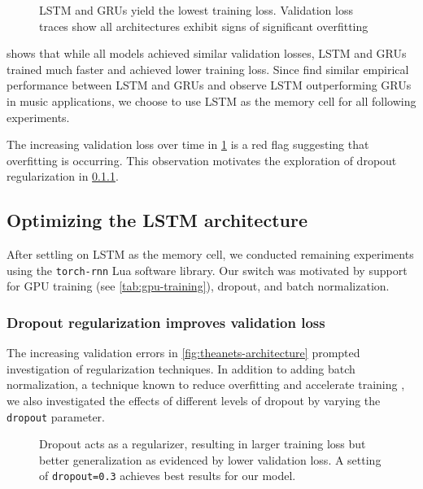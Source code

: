 \begin{figure}[tb]
    \centering
    
    \caption{LSTM and GRUs yield the lowest training loss. Validation loss
      traces show all architectures exhibit signs of significant overfitting}
    \label{fig:theanets-architecture}
\end{figure}

 shows that while all models achieved similar
validation losses, LSTM and GRUs trained much faster and achieved lower
training loss. Since \citet{zaremba2015empirical} find similar empirical
performance between LSTM and GRUs and \citet{Nayebi2015} observe LSTM
outperforming GRUs in music applications, we choose to use LSTM as the memory
cell for all following experiments.

The increasing validation loss over time in \cref{fig:theanets-architecture}
is a red flag suggesting that overfitting is occurring. This observation motivates
the exploration of dropout regularization in \cref{sec:lstm-dropout}.

\subsection{Optimizing the LSTM architecture}\label{sec:lstm-grid-search}

After settling on LSTM as the memory cell, we conducted remaining experiments
using the \texttt{torch-rnn} Lua software library. Our switch was motivated by
support for GPU training (see \vref{tab:gpu-training}), dropout, and batch normalization.

\subsubsection{Dropout regularization improves validation loss}\label{sec:lstm-dropout}

The increasing validation errors in \vref{fig:theanets-architecture} prompted
investigation of regularization techniques. In addition to adding batch
normalization, a technique known to reduce overfitting and accelerate training
\cite{ioffe2015batch}, we also investigated the effects of different levels
of dropout by varying the \texttt{dropout} parameter.

\begin{figure}[tb]
  \centering
  
  \caption{Dropout acts as a regularizer, resulting in larger training loss
  but better generalization as evidenced by lower validation loss. A setting of
\texttt{dropout=0.3} achieves best results for our model.}
  \label{fig:torch-rnn-dropout}
\end{figure}

